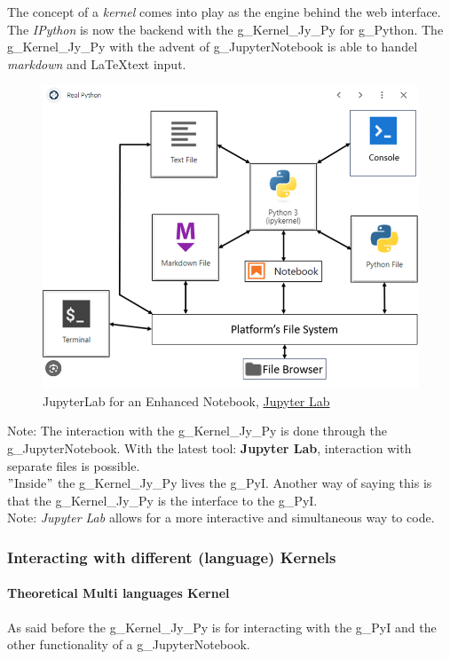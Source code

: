 The concept of a \textit{kernel} comes into play as the engine behind the web interface. The \textit{IPython} is now the backend with the \gls{g_Kernel_Jy_Py} for \gls{g_Python}. The \gls{g_Kernel_Jy_Py} with the advent of \gls{g_JupyterNotebook} is able to handel \textit{markdown} and \LaTeX text input.\\
\begin{figure}[H]
	\centering
	\includegraphics[scale = 0.3]{attachment/chapter_AML/Scc006}
	\caption{JupyterLab for an Enhanced Notebook, \href{https://realpython.com/using-jupyterlab/}{Jupyter Lab}}
\end{figure}
Note: The interaction with the \gls{g_Kernel_Jy_Py} is done through the \gls{g_JupyterNotebook}. With the latest tool: \textbf{Jupyter Lab}, interaction with separate files is possible.\\

$"$Inside$"$ the \gls{g_Kernel_Jy_Py} lives the \gls{g_PyI}. Another way of saying this is that the \gls{g_Kernel_Jy_Py} is the interface to the \gls{g_PyI}.\\

Note: \textit{Jupyter Lab} allows for a more interactive and simultaneous way to code.

\subsubsection{Interacting with different (language) Kernels}
\paragraph{Theoretical Multi languages Kernel}
As said before the \gls{g_Kernel_Jy_Py} is for interacting with the \gls{g_PyI} and the other functionality of a \gls{g_JupyterNotebook}.\\


